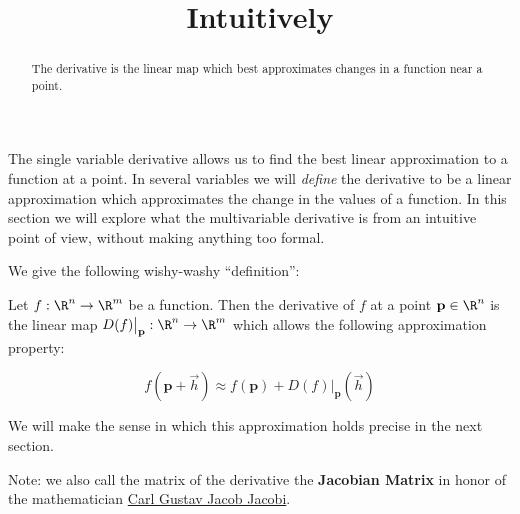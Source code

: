 \documentclass{ximera}
\title{Intuitively}
\begin{document}
\begin{abstract}
  The derivative is the linear map which best approximates changes in a function near a point.
\end{abstract}
\maketitle

The single variable derivative allows us to find the best linear
approximation to a function at a point.  In several variables we will
\textit{define} the derivative to be a linear approximation which
approximates the change in the values of a function.  In this section
we will explore what the multivariable derivative is from an intuitive
point of view, without making anything too formal.

We give the following wishy-washy ``definition'':

\begin{definition}
	Let $f:\R^n \to \R^m$ be a function.  Then the derivative of $f$ at a point $\mathbf{p} \in \R^n$ is the linear map $D(f)\big|_{\mathbf{p}}:\R^n \to \R^m$ 
	which allows the following approximation property:
	
	\[
		f(\mathbf{p} + \vec{h}) \approx f(\mathbf{p}) + D(f)\big|_{\mathbf{p}}(\vec{h})
	\]
	
	We will make the sense in which this approximation holds precise in the next section.
\end{definition}

Note:  we also call the matrix of the derivative the \textbf{Jacobian Matrix} in honor of the mathematician 
\href{http://en.wikipedia.org/wiki/Carl_Gustav_Jacob_Jacobi}{Carl Gustav Jacob Jacobi}.
\end{document}
